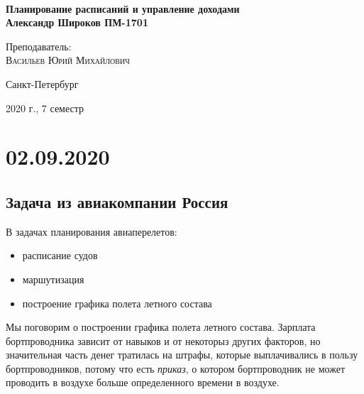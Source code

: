 \documentclass[%
10pt, %
final, %
oneside, %
onecolumn, %
centertags]{article} %
\theoremstyle{plain}
\theoremstyle{definition}
\theoremstyle{remark}
\begin{document}
\begin{titlepage} 
\begin{center}
\textbf{}\\[10.0cm]
\textbf{\LARGE Планирование расписаний и управление доходами}\\[0.5cm]
\textbf{\Large Александр Широков ПМ-1701} \\[0.2cm]


\begin{center} \large
{Преподаватель:} \\[0.5cm]
\textsc {Васильев Юрий Михайлович}\\
\end{center}

\vfill 



{\large {Санкт-Петербург}} \par
{\large {2020 г., 7 семестр}}
\end{center} 
\end{titlepage}

\begin{thebibliography}{3}
\end{thebibliography}
\tableofcontents
\newpage

\section{02.09.2020}

\subsection{Задача из авиакомпании Россия}

В задачах планирования авиаперелетов:

\begin{itemize}
	\item расписание судов
	\item маршутизация
	\item построение графика полета летного состава
\end{itemize}

Мы поговорим о построении графика полета летного состава. Зарплата бортпроводника зависит от навыков и от некоторыз других факторов, но значительная часть денег тратилась на штрафы, которые выплачивались в пользу бортпроводников, потому что есть \textit{приказ}, о котором бортпроводник не может проводить в воздухе больше определенного времени в воздухе. 
\end{document}
